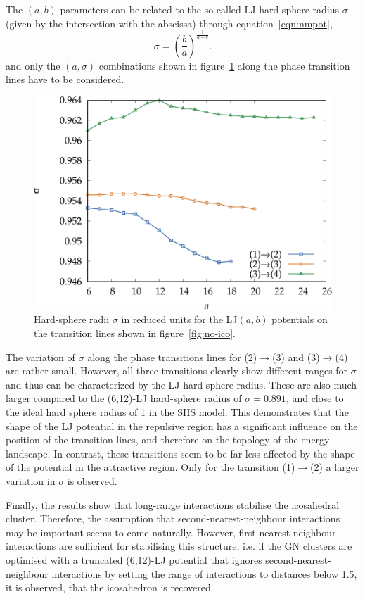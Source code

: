 The $(a,b)$ parameters can be related to the so-called \ac{LJ} hard-sphere radius
$\sigma$ (given by the intersection with the abscissa) through
equation~\eqref{eqn:nmpot},
%
\begin{equation}
    \sigma=\left(\frac{b}{a}\right)^{\frac{1}{a-b}}.
\end{equation}
%
and only the $(a,\sigma)$ combinations shown in figure~\ref{fig:hardsphere}
along the phase transition lines have to be considered.
%
\begin{figure}[htb]\centering
    \includegraphics[width=.8\columnwidth]{gregory-newton/sigma.pdf}
    \caption{Hard-sphere radii $\sigma$ in reduced units for the LJ$(a,b)$
    potentials on the transition lines shown in figure~\ref{fig:no-ico}.}
    \label{fig:hardsphere}
\end{figure}

The variation of $\sigma$ along the phase transitions lines for
(2)$\rightarrow$(3) and (3)$\rightarrow$(4) are rather small. However, all three
transitions clearly show different ranges for $\sigma$ and thus can be
characterized by the \ac{LJ} hard-sphere radius. These are also much larger
compared to the (6,12)-\ac{LJ} hard-sphere radius of $\sigma=0.891$, and close
to the ideal hard sphere radius of 1 in the \ac{SHS} model. This demonstrates
that the shape of the \ac{LJ} potential in the repulsive region has a
significant influence on the position of the transition lines, and therefore on
the topology of the energy landscape. In contrast, these transitions seem to be
far less affected by the shape of the potential in the attractive region. Only
for the transition (1)$\rightarrow$(2) a larger variation in $\sigma$ is
observed.

Finally, the results show that long-range interactions stabilise the icosahedral
cluster. Therefore, the assumption that second-nearest-neighbour interactions
may be important seems to come naturally. However, first-nearest neighbour
interactions are sufficient for stabilising this structure, i.e. if the \ac{GN}
clusters are optimised with a truncated (6,12)-\ac{LJ} potential that ignores
second-nearest-neighbour interactions by setting the range of interactions to
distances below 1.5, it is observed, that the icosahedron is recovered.

